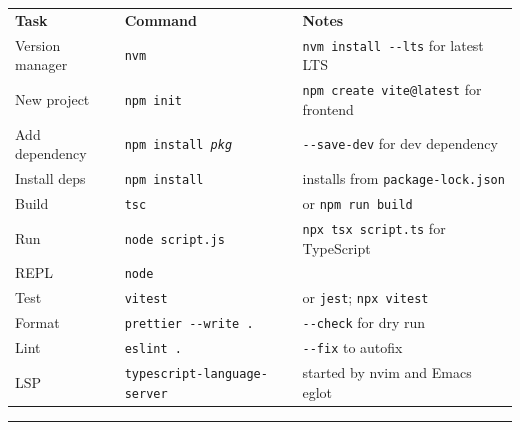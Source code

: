 \documentclass[10pt]{extarticle}
\begin{document}
\small


\begin{tabularx}{\linewidth}{@{}l@{\quad}l@{\quad}Y@{}}
\textbf{Task}        & \textbf{Command}                                  & \textbf{Notes} \\[2pt]
Version manager      & \texttt{nvm}                                       & \texttt{nvm install -{}-lts} for latest LTS \\
New project          & \texttt{npm init}                                  & \texttt{npm create vite@latest} for frontend \\
Add dependency       & \texttt{npm install \textit{pkg}}                  & \texttt{-{}-save-dev} for dev dependency \\
Install deps         & \texttt{npm install}                               & installs from \texttt{package-lock.json} \\
Build                & \texttt{tsc}                                       & or \texttt{npm run build} \\
Run                  & \texttt{node script.js}                            & \texttt{npx tsx script.ts} for TypeScript \\
REPL                 & \texttt{node}                                      & \\
Test                 & \texttt{vitest}                                    & or \texttt{jest}; \texttt{npx vitest} \\
Format               & \texttt{prettier -{}-write .}                     & \texttt{-{}-check} for dry run \\
Lint                 & \texttt{eslint .}                                  & \texttt{-{}-fix} to autofix \\
LSP                  & \texttt{typescript-language-server}                 & started by nvim and Emacs eglot \\
\end{tabularx}

\vspace{6pt}
\rule{\linewidth}{0.2pt}
\end{document}
